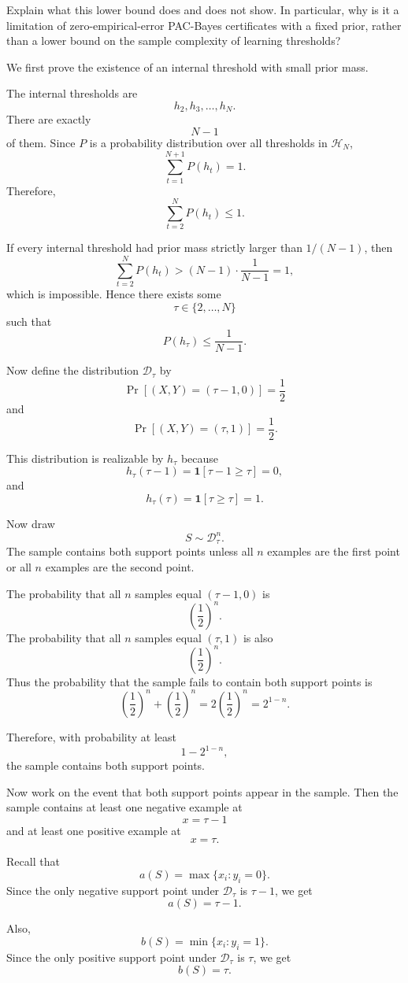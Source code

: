 \documentclass[11pt]{article}
\begin{document}
Explain what this lower bound does and does not show. In particular, why is it a 
limitation of zero-empirical-error PAC-Bayes certificates with a fixed prior, rather 
than a lower bound on the sample complexity of learning thresholds?
\begin{solutionbox}

We first prove the existence of an internal threshold with small prior mass.

The internal thresholds are
\[
h_2,h_3,\dots,h_N.
\]
There are exactly
\[
N-1
\]
of them. Since $P$ is a probability distribution over all thresholds in $\mathcal H_N$,
\[
\sum_{t=1}^{N+1}P(h_t)=1.
\]
Therefore,
\[
\sum_{t=2}^{N}P(h_t)\le 1.
\]

If every internal threshold had prior mass strictly larger than $1/(N-1)$, then
\[
\sum_{t=2}^{N}P(h_t)
>
(N-1)\cdot \frac{1}{N-1}
=
1,
\]
which is impossible. Hence there exists some
\[
\tau\in\{2,\dots,N\}
\]
such that
\[
\boxed{
P(h_\tau)\le \frac{1}{N-1}.
}
\]

Now define the distribution $\mathcal D_\tau$ by
\[
\Pr[(X,Y)=(\tau-1,0)]=\frac12
\]
and
\[
\Pr[(X,Y)=(\tau,1)]=\frac12.
\]

This distribution is realizable by $h_\tau$ because
\[
h_\tau(\tau-1)
=
\mathbf 1[\tau-1\ge \tau]
=
0,
\]
and
\[
h_\tau(\tau)
=
\mathbf 1[\tau\ge \tau]
=
1.
\]

Now draw
\[
S\sim \mathcal D_\tau^n.
\]
The sample contains both support points unless all $n$ examples are the first point or all $n$ examples are the second point.

The probability that all $n$ samples equal $(\tau-1,0)$ is
\[
\left(\frac12\right)^n.
\]
The probability that all $n$ samples equal $(\tau,1)$ is also
\[
\left(\frac12\right)^n.
\]
Thus the probability that the sample fails to contain both support points is
\[
\left(\frac12\right)^n+\left(\frac12\right)^n
=
2\left(\frac12\right)^n
=
2^{1-n}.
\]

Therefore, with probability at least
\[
\boxed{
1-2^{1-n},
}
\]
the sample contains both support points.

Now work on the event that both support points appear in the sample. Then the sample contains at least one negative example at
\[
x=\tau-1
\]
and at least one positive example at
\[
x=\tau.
\]

Recall that
\[
a(S)=\max\{x_i:y_i=0\}.
\]
Since the only negative support point under $\mathcal D_\tau$ is $\tau-1$, we get
\[
a(S)=\tau-1.
\]

Also,
\[
b(S)=\min\{x_i:y_i=1\}.
\]
Since the only positive support point under $\mathcal D_\tau$ is $\tau$, we get
\[
b(S)=\tau.
\]


\end{solutionbox}
\end{document}

